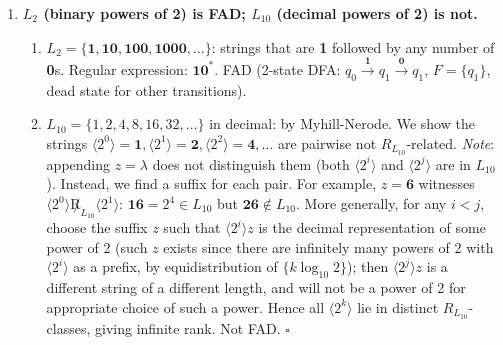 \begin{enumerate}[{2.}1.]
\item \textbf{$L_2$ (binary powers of 2) is FAD; $L_{10}$ (decimal powers of 2) is not.}

\begin{enumerate}
\item $L_2=\{\mathbf{1},\mathbf{10},\mathbf{100},\mathbf{1000},\ldots\}$: strings that are \textbf{1} followed by any number of \textbf{0}s. Regular expression: $\mathbf{1}\mathbf{0}^*$. FAD (2-state DFA: $q_0\xrightarrow{\mathbf{1}}q_1\xrightarrow{\mathbf{0}}q_1$, $F=\{q_1\}$, dead state for other transitions).

\item $L_{10}=\{1,2,4,8,16,32,\ldots\}$ in decimal: by Myhill-Nerode. We show the strings $\langle 2^0\rangle=\mathbf{1},\langle 2^1\rangle=\mathbf{2},\langle 2^2\rangle=\mathbf{4},\ldots$ are pairwise not $R_{L_{10}}$-related. \emph{Note}: appending $z=\lambda$ does not distinguish them (both $\langle 2^i\rangle$ and $\langle 2^j\rangle$ are in $L_{10}$). Instead, we find a suffix for each pair. For example, $z=\mathbf{6}$ witnesses $\langle 2^0\rangle\not R_{L_{10}}\langle 2^1\rangle$: $\mathbf{16}=2^4\in L_{10}$ but $\mathbf{26}\notin L_{10}$. More generally, for any $i<j$, choose the suffix $z$ such that $\langle 2^i\rangle z$ is the decimal representation of some power of 2 (such $z$ exists since there are infinitely many powers of 2 with $\langle 2^i\rangle$ as a prefix, by equidistribution of $\{k\log_{10}2\}$); then $\langle 2^j\rangle z$ is a different string of a different length, and will not be a power of 2 for appropriate choice of such a power. Hence all $\langle 2^k\rangle$ lie in distinct $R_{L_{10}}$-classes, giving infinite rank. Not FAD. $\square$
\end{enumerate}

\end{enumerate}
